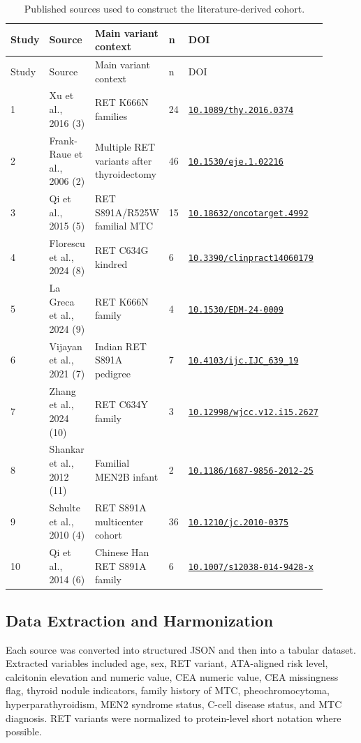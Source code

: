 \documentclass[12pt]{article}
\newcommand{\doi}[1]{\href{https://doi.org/#1}{\nolinkurl{#1}}}
\begin{document}
\begin{longtable}{@{}p{0.08\linewidth}p{0.28\linewidth}p{0.22\linewidth}p{0.08\linewidth}p{0.24\linewidth}@{}}
\caption{Published sources used to construct the literature-derived cohort.} \\
\toprule
Study & Source & Main variant context & n & DOI \\
\midrule
\endfirsthead
\toprule
Study & Source & Main variant context & n & DOI \\
\midrule
\endhead
1 & Xu et al., 2016 (3) & RET K666N families & 24 & \doi{10.1089/thy.2016.0374} \\
2 & Frank-Raue et al., 2006 (2) & Multiple RET variants after thyroidectomy & 46 & \doi{10.1530/eje.1.02216} \\
3 & Qi et al., 2015 (5) & RET S891A/R525W familial MTC & 15 & \doi{10.18632/oncotarget.4992} \\
4 & Florescu et al., 2024 (8) & RET C634G kindred & 6 & \doi{10.3390/clinpract14060179} \\
5 & La Greca et al., 2024 (9) & RET K666N family & 4 & \doi{10.1530/EDM-24-0009} \\
6 & Vijayan et al., 2021 (7) & Indian RET S891A pedigree & 7 & \doi{10.4103/ijc.IJC_639_19} \\
7 & Zhang et al., 2024 (10) & RET C634Y family & 3 & \doi{10.12998/wjcc.v12.i15.2627} \\
8 & Shankar et al., 2012 (11) & Familial MEN2B infant & 2 & \doi{10.1186/1687-9856-2012-25} \\
9 & Schulte et al., 2010 (4) & RET S891A multicenter cohort & 36 & \doi{10.1210/jc.2010-0375} \\
10 & Qi et al., 2014 (6) & Chinese Han RET S891A family & 6 & \doi{10.1007/s12038-014-9428-x} \\
\bottomrule
\end{longtable}

\subsection{Data Extraction and Harmonization}
Each source was converted into structured JSON and then into a tabular dataset. Extracted variables included age, sex, RET variant, ATA-aligned risk level, calcitonin elevation and numeric value, CEA numeric value, CEA missingness flag, thyroid nodule indicators, family history of MTC, pheochromocytoma, hyperparathyroidism, MEN2 syndrome status, C-cell disease status, and MTC diagnosis. RET variants were normalized to protein-level short notation where possible.
\end{document}
